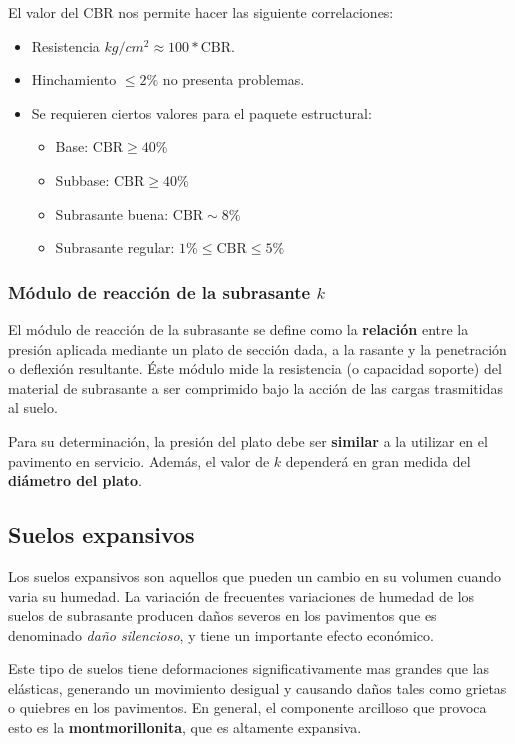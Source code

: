 \documentclass[../main.tex]{subfiles}
\begin{document}
El valor del CBR nos permite hacer las siguiente correlaciones:

\begin{itemize}
  \item Resistencia $kg/cm^2 \approx 100 * \text{CBR}$.
  \item Hinchamiento $\leq 2\%$ no presenta problemas.
  \item Se requieren ciertos valores para el paquete estructural:
    \begin{itemize}
    \item Base: $\text{CBR} \geq 40\%$
    \item Subbase: $\text{CBR} \geq  40\%$
    \item Subrasante buena: $\text{CBR} \sim 8\%$    
    \item Subrasante regular: $1\% \leq \text{CBR} \leq 5\%$
    \end{itemize}
\end{itemize}

\subsubsection{Módulo de reacción de la subrasante $k$}

El módulo de reacción de la subrasante se define como la \textbf{relación} entre
la presión aplicada mediante un plato de sección dada, a la rasante y la penetración
o deflexión resultante. Éste módulo mide la resistencia (o capacidad soporte) del
material de subrasante a ser comprimido bajo la acción de las cargas trasmitidas
al suelo.

Para su determinación, la presión del plato debe ser \textbf{similar} a la utilizar
en el pavimento en servicio. Además, el valor de $k$ dependerá en gran medida
del \textbf{diámetro del plato}.

\subsection{Suelos expansivos}

Los suelos expansivos son aquellos que pueden un cambio en su volumen cuando
varia su humedad. La variación de frecuentes variaciones de humedad de los suelos
de subrasante producen daños severos en los pavimentos que es denominado
\textit{daño silencioso}, y tiene un importante efecto económico.

Este tipo de suelos tiene deformaciones significativamente mas grandes que las 
elásticas, generando un movimiento desigual y causando daños tales como grietas
o quiebres en los pavimentos. En general, el componente arcilloso que provoca esto
es la \textbf{montmorillonita}, que es altamente expansiva. 
\end{document}
